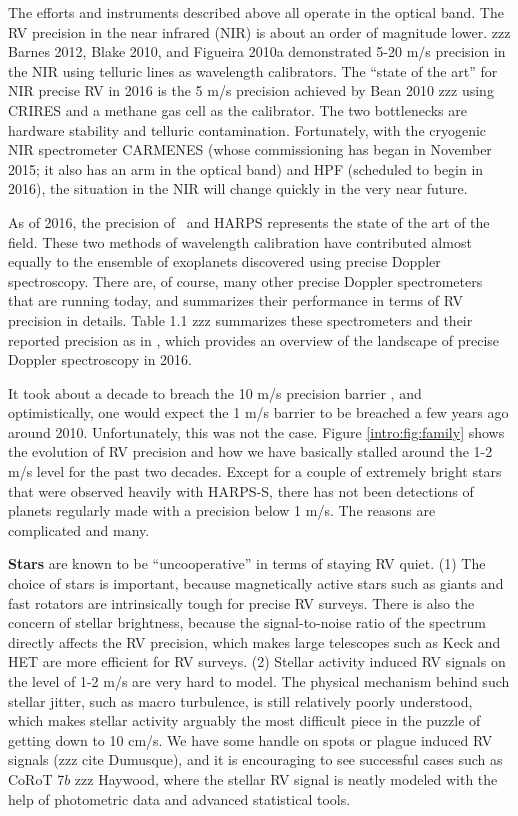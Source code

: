 The efforts and instruments described above all operate in the optical
band. The RV precision in the near infrared (NIR) is about an order of
magnitude lower. zzz Barnes 2012, Blake 2010, and Figueira 2010a
demonstrated 5-20 m/s precision in the NIR using telluric lines as
wavelength calibrators. The ``state of the art'' for NIR precise RV in
2016 is the 5 m/s precision achieved by Bean 2010 zzz using CRIRES and
a methane gas cell as the calibrator. The two bottlenecks are hardware
stability and telluric contamination. Fortunately, with the cryogenic
NIR spectrometer CARMENES (whose commissioning has began in November
2015; it also has an arm in the optical band) and HPF (scheduled to
begin in 2016), the situation in the NIR will change quickly in the
very near future.

As of 2016, the precision of \keck\ and HARPS represents the state
of the art of the field. These two methods of wavelength calibration
have contributed almost equally to the ensemble of exoplanets
discovered using precise Doppler spectroscopy. There are, of course,
many other precise Doppler spectrometers that are running today, and
\cite{eprv2015} summarizes their performance in terms of RV
precision in details. Table 1.1 zzz summarizes these spectrometers and
their reported precision as in \cite{eprv2015}, which provides an
overview of the landscape of precise Doppler spectroscopy in 2016.

It took about a decade to breach the 10 m/s precision barrier
\citep{butler1996}, and optimistically, one would expect the 1 m/s
barrier to be breached a few years ago around 2010. Unfortunately,
this was not the case. Figure \ref{intro:fig:family} shows the
evolution of RV precision and how we have basically stalled around the
1-2 m/s level for the past two decades. Except for a couple of
extremely bright stars that were observed heavily with HARPS-S, there
has not been detections of planets regularly made with a precision
below 1 m/s. The reasons are complicated and many.

{\bf Stars} are known to be ``uncooperative'' in terms of staying RV
quiet. (1) The choice of stars is important, because magnetically
active stars such as giants and fast rotators are intrinsically tough
for precise RV surveys. There is also the concern of stellar
brightness, because the signal-to-noise ratio of the spectrum directly
affects the RV precision, which makes large telescopes such as Keck
and HET are more efficient for RV surveys. (2) Stellar activity
induced RV signals on the level of 1-2 m/s are very hard to model. The
physical mechanism behind such stellar jitter, such as macro
turbulence, is still relatively poorly understood, which makes stellar
activity arguably the most difficult piece in the puzzle of getting
down to 10 cm/s. We have some handle on spots or plague induced RV
signals (zzz cite Dumusque), and it is encouraging to see successful
cases such as CoRoT 7$b$ zzz Haywood, where the stellar RV signal is
neatly modeled with the help of photometric data and advanced
statistical tools.

